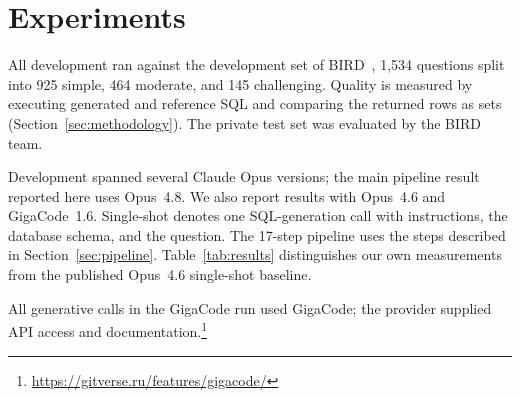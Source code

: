 \section{Experiments}

All development ran against the development set of BIRD~\cite{bird}, 1,534
questions split into 925 simple, 464 moderate, and 145 challenging.
Quality is measured by executing generated and reference SQL and comparing
the returned rows as sets (Section~\ref{sec:methodology}). The private test
set was evaluated by the BIRD team.

Development spanned several Claude Opus versions; the main pipeline result
reported here uses Opus~4.8. We also report results with Opus~4.6 and
GigaCode~1.6. Single-shot denotes one SQL-generation call with instructions,
the database schema, and the question. The 17-step pipeline uses the steps
described in Section~\ref{sec:pipeline}. Table~\ref{tab:results} distinguishes
our own measurements from the published Opus~4.6 single-shot baseline.

All generative calls in the GigaCode run used GigaCode; the provider supplied
API access and documentation.\footnote{\url{https://gitverse.ru/features/gigacode/}}


